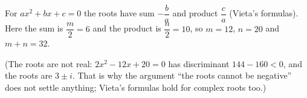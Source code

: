 For $ax^2+bx+c=0$ the roots have sum $-\dfrac {b}{a}$ and product $\dfrac {c}{a}$ (Vieta's formulas). Here the sum is $\dfrac {m}{2}=6$ and the product is $\dfrac {n}{2}=10$, so $m=12$, $n=20$ and $m+n=\boxed{32}$.

(The roots are not real: $2x^2-12x+20=0$ has discriminant $144-160<0$, and the roots are $3\pm i$. That is why the argument ``the roots cannot be negative'' does not settle anything; Vieta's formulas hold for complex roots too.)

